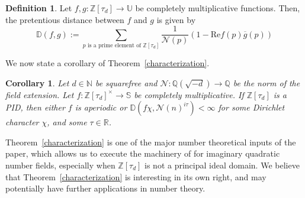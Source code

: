 \documentclass[11pt]{amsart}
\newtheorem{corollary}[lemma]{Corollary}
\theoremstyle{definition}
\newtheorem{definition}[lemma]{Definition}
\newcommand{\C}{{\mathbb C}}
\newcommand{\D}{{\mathbb D}}
\newcommand{\N}{{\mathbb N}}
\newcommand{\NN}{{\mathcal N}}
\newcommand{\Q}{{\mathbb Q}}
\newcommand{\R}{{\mathbb R}}
\renewcommand{\S}{\mathbb{S}}
\newcommand{\Z}{{\mathbb Z}}
\newcommand{\U}{{\mathbb U}}
\newcommand{\WS}[1]{{\color{blue}{{#1}}}}
\newcommand{\AK}[1]{{\color{ForestGreen}{{#1}}}}
\begin{document}
\begin{definition}
Let $f,g: \Z[\tau_d]\to \U$ be completely multiplicative functions. Then, the pretentious distance between $f$ and $g$ is given by
\[
\D(f,g):= \sum_{p \text{ is a prime element of } \Z[\tau_{d}]}\frac{1}{\NN(p)}(1-\text{Re}f(p)\overline{g}(p))
\]
\end{definition}
We now state a corollary of Theorem~\ref{characterization}.
\begin{corollary} 
     Let  $d\in\N$ be squarefree and $\NN\colon \Q(\sqrt{-d})\to \Q$ be the norm of the field extension. Let $f\colon \Z[\tau_{d}]^{\times}\to\S$ be completely multiplicative. If $\Z[\tau_{d}]$ is a PID, then either $f$ is aperiodic or  $\D(f\chi,\NN(n)^{i\tau})<\infty$ for some Dirichlet character $\chi$, and some $\tau\in\R$.
\end{corollary}

Theorem~\ref{characterization} is one of the major number theoretical inputs of the paper, which allows us to execute the machinery of \cite{FKM1} for imaginary quadratic number fields, especially when $\Z[\tau_{d}]$ is not a principal ideal domain. We believe that Theorem~\ref{characterization} is interesting in its own right, and may potentially have further applications in number theory.

\end{document}

